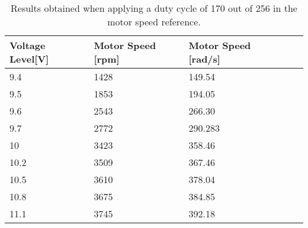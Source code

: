 \begin{table}[H]
	\centering
	\begin{tabular}{|l|l|l|l|p{4.3cm}|}
		\hline%
		\textbf{Voltage Level[V]}    & \textbf{Motor Speed [rpm]} & \textbf{Motor Speed [rad/s]} \\ 
		\hline%
		9.4                & 1428         	   &  149.54                                       \\
		\hline%
		9.5      &  1853 						       &  194.05				                \\
		\hline%
		9.6       &  2543                               &  266.30   			                  \\
		\hline%
		9.7    & 2772                               &  290.283  			                       \\
		\hline%
		10   &    3423                               &  358.46                                 \\
		\hline%
		10.2   &  3509 						       &  367.46				                   \\
		\hline%
		10.5 &  3610                               &  378.04    			                    \\
		\hline%
		10.8   &    3675                               &  384.85                               \\
		\hline%
		11.1     &  3745 						       &  392.18				                \\
		\hline%
	\end{tabular}
	\caption{Results obtained when applying a duty cycle of 170 out of 256 in the motor speed reference.}
\end{table}
